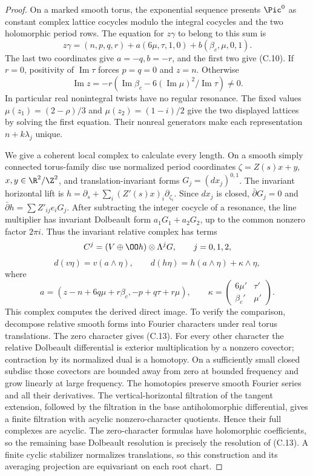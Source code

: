 \begin{proof}
On a marked smooth torus, the exponential sequence presents $\Pic^0$ as constant complex lattice cocycles modulo the integral cocycles and the two holomorphic period rows. The equation for $z\gamma$ to belong to this sum is
\[
 z\gamma=(n,p,q,r)+a(6\mu,\tau,1,0)+b(\beta_c,\mu,0,1).
\]
The last two coordinates give $a=-q,b=-r$, and the first two give (C.10). If $r=0$, positivity of $\operatorname{Im}\tau$ forces $p=q=0$ and $z=n$. Otherwise
\[
 \operatorname{Im}z=-r\left(\operatorname{Im}\beta_c-
           6(\operatorname{Im}\mu)^2/\operatorname{Im}\tau\right)\ne0.
\]
In particular real nonintegral twists have no regular resonance. The fixed values $\mu(z_1)=(2-\rho)/3$ and $\mu(z_2)=(1-i)/2$ give the two displayed lattices by solving the first equation. Their nonreal generators make each representation $n+k\lambda_j$ unique.

We give a coherent local complex to calculate every length. On a smooth simply connected torus-family disc use normalized period coordinates $\zeta=Z(s)x+y$, $x,y\in\R^2/\Z^2$, and translation-invariant forms $G_j=(dx_j)^{0,1}$. The invariant horizontal lift is $h=\partial_s+\sum_i(Z'(s)x)_i\partial_{\zeta_i}$. Since $dx_j$ is closed, $\bar\partial G_j=0$ and
$\bar\partial h=\sum Z'_{ij}e_iG_j$. After subtracting the integer cocycle of a resonance, the line multiplier has invariant Dolbeault form $a_1G_1+a_2G_2$, up to the common nonzero factor $2\pi i$. Thus the invariant relative complex has terms
\[
 C^j=(V\oplus\OO h)\otimes\Lambda^jG,\qquad j=0,1,2,
\]
\[
 d(v\eta)=v(a\wedge\eta),\qquad
 d(h\eta)=h(a\wedge\eta)+\kappa\wedge\eta,             \tag{C.13}
\]
where
\[
 a=(z-n+6q\mu+r\beta_c,-p+q\tau+r\mu),\qquad
 \kappa=\begin{pmatrix}6\mu'&\tau'\\\beta_c'&\mu'\end{pmatrix}.
\]
This complex computes the derived direct image. To verify the comparison, decompose relative smooth forms into Fourier characters under real torus translations. The zero character gives (C.13). For every other character the relative Dolbeault differential is exterior multiplication by a nonzero covector; contraction by its normalized dual is a homotopy. On a sufficiently small closed subdisc those covectors are bounded away from zero at bounded frequency and grow linearly at large frequency. The homotopies preserve smooth Fourier series and all their derivatives. The vertical-horizontal filtration of the tangent extension, followed by the filtration in the base antiholomorphic differential, gives a finite filtration with acyclic nonzero-character quotients. Hence their full complexes are acyclic. The zero-character formulas have holomorphic coefficients, so the remaining base Dolbeault resolution is precisely the resolution of (C.13). A finite cyclic stabilizer normalizes translations, so this construction and its averaging projection are equivariant on each root chart.


\end{proof}
